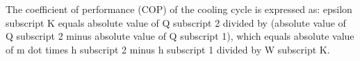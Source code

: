 The coefficient of performance (COP) of the cooling cycle is expressed as:  
epsilon subscript K equals absolute value of Q subscript 2 divided by (absolute value of Q subscript 2 minus absolute value of Q subscript 1), which equals absolute value of m dot times h subscript 2 minus h subscript 1 divided by W subscript K.